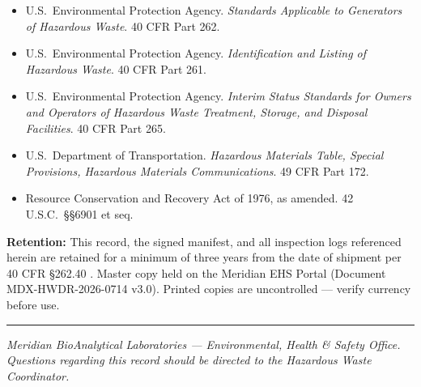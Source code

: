\vspace{4pt}

{\small
\begin{itemize}[leftmargin=*, itemsep=3pt]
  \item U.S.\ Environmental Protection Agency. \textit{Standards
        Applicable to Generators of Hazardous Waste}. 40 CFR Part 262.
        \cite{cfr262_2026}
  \item U.S.\ Environmental Protection Agency. \textit{Identification and
        Listing of Hazardous Waste}. 40 CFR Part 261. \cite{cfr261_2026}
  \item U.S.\ Environmental Protection Agency. \textit{Interim Status
        Standards for Owners and Operators of Hazardous Waste Treatment,
        Storage, and Disposal Facilities}. 40 CFR Part 265.
        \cite{cfr265_2026}
  \item U.S.\ Department of Transportation. \textit{Hazardous Materials
        Table, Special Provisions, Hazardous Materials Communications}.
        49 CFR Part 172. \cite{cfr172_2026}
  \item Resource Conservation and Recovery Act of 1976, as amended.
        42 U.S.C.\ \S\S 6901 et seq. \cite{rcra1976}
\end{itemize}
}

\vspace{8pt}

\begin{tcolorbox}[infobox]
  \faCalendar\quad \textbf{Retention:} This record, the signed manifest,
  and all inspection logs referenced herein are retained for a minimum of
  three years from the date of shipment per 40 CFR \S 262.40
  \cite{cfr262_2026}. Master copy held on the Meridian EHS Portal
  (Document MDX-HWDR-2026-0714 v3.0). Printed copies are uncontrolled ---
  verify currency before use.
\end{tcolorbox}

\vspace{8pt}
{\color{SlateInk!40}\hrule}
\vspace{4pt}
{\footnotesize\color{SlateInk!60}\textit{%
  Meridian BioAnalytical Laboratories --- Environmental, Health \& Safety
  Office. Questions regarding this record should be directed to the
  Hazardous Waste Coordinator.
}}

